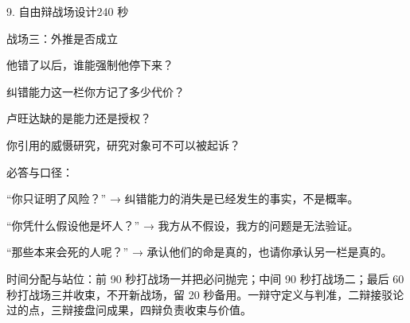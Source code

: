 \documentclass[script,con]{debate}
\begin{document}
\begin{stage}{9. 自由辩战场设计}{240 秒}
\begin{battleground}{战场三：外推是否成立}
\begin{bullets}
\item 他错了以后，谁能强制他停下来？
\item 纠错能力这一栏你方记了多少代价？
\item 卢旺达缺的是能力还是授权？
\item 你引用的威慑研究，研究对象可不可以被起诉？
\end{bullets}
必答与口径：

\begin{bullets}
\item “你只证明了风险？” → 纠错能力的消失是已经发生的事实，不是概率。
\item “你凭什么假设他是坏人？” → 我方从不假设，我方的问题是无法验证。
\item “那些本来会死的人呢？” → 承认他们的命是真的，也请你承认另一栏是真的。
\end{bullets}
时间分配与站位：前 90 秒打战场一并把必问抛完；中间 90 秒打战场二；最后 60 秒打战场三并收束，不开新战场，留 20 秒备用。一辩守定义与判准，二辩接驳论过的点，三辩接盘问成果，四辩负责收束与价值。

\end{battleground}
\end{stage}
\end{document}
